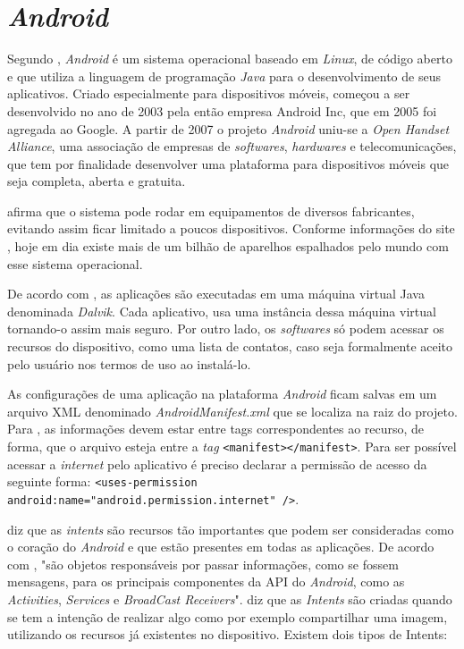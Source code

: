 \section{\textit{Android}}

	\par Segundo , \textit{Android} é um sistema
operacional baseado em \textit{Linux}, de código aberto e que utiliza a
linguagem de programação \textit{Java} para o desenvolvimento de seus
aplicativos. Criado especialmente para dispositivos móveis, começou a
ser desenvolvido no ano de 2003 pela então empresa Android Inc, que em 2005 foi
agregada ao Google. A partir de 2007 o projeto \textit{Android} uniu-se a
\textit{Open Handset Alliance}, uma associação de empresas de
\textit{softwares}, \textit{hardwares} e telecomunicações, que tem por
finalidade desenvolver uma plataforma para dispositivos móveis que seja
completa, aberta e gratuita.

	\par {} afirma que o sistema pode rodar em equipamentos
de diversos fabricantes, evitando assim ficar limitado a poucos dispositivos.
Conforme informações do site , hoje em dia existe mais de
um bilhão de aparelhos espalhados pelo mundo com esse sistema operacional.

	\par De acordo com , as aplicações são executadas em
uma máquina virtual Java denominada \textit{Dalvik}. Cada aplicativo, usa uma
instância dessa máquina virtual tornando-o assim mais seguro. Por outro lado, os
\textit{softwares} só podem acessar os recursos do dispositivo, como uma
lista de contatos, caso seja formalmente aceito pelo usuário nos termos de uso
ao instalá-lo.

	\par As configurações de uma aplicação na plataforma \textit{Android} ficam
salvas em um arquivo XML denominado \textit{AndroidManifest.xml} que se localiza
na raiz do projeto. Para , as informações devem estar
entre tags correspondentes ao recurso, de forma, que o arquivo esteja entre a
\textit{tag} \texttt{<manifest></manifest>}. Para ser possível acessar a
\textit{internet} pelo aplicativo é preciso declarar a permissão de acesso da
seguinte forma: \texttt{<uses-permission
android:name="android.permission.internet" />}.

	\par {} diz que as \textit{intents} são recursos tão
importantes que podem ser consideradas como o coração do \textit{Android} e que
estão presentes em todas as aplicações.	De acordo com
, "são objetos responsáveis por passar informações,
como se fossem mensagens, para os principais componentes da API do
\textit{Android}, como as \textit{Activities}, \textit{Services} e
\textit{BroadCast Receivers}".  diz que as
\textit{Intents} são criadas quando se tem a intenção de realizar algo como por
exemplo compartilhar uma imagem, utilizando os recursos já existentes no
dispositivo. Existem dois tipos de Intents:
	
